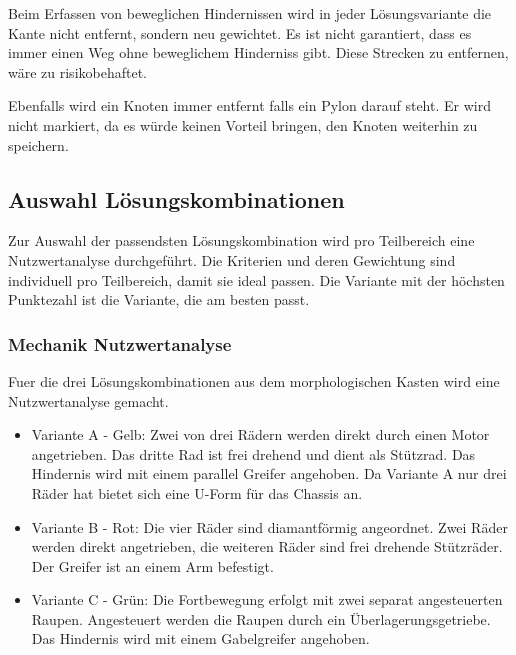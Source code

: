 Beim Erfassen von beweglichen Hindernissen wird in jeder Lösungsvariante die Kante nicht entfernt, sondern neu gewichtet. Es ist nicht garantiert, dass es immer einen Weg ohne beweglichem Hinderniss gibt. Diese Strecken zu entfernen, wäre zu risikobehaftet.

Ebenfalls wird ein Knoten immer entfernt falls ein Pylon darauf steht. Er wird nicht markiert, da es würde keinen Vorteil bringen, den Knoten weiterhin zu speichern.


\newpage
\subsection{Auswahl Lösungskombinationen}\label{nutzwertanalyse}

Zur Auswahl der passendsten Lösungskombination wird pro Teilbereich eine Nutzwertanalyse durchgeführt. Die Kriterien und deren Gewichtung sind individuell pro Teilbereich, damit sie ideal passen. Die Variante mit der höchsten Punktezahl ist die Variante, die am besten passt.

\subsubsection{Mechanik Nutzwertanalyse}

Fuer die  drei Lösungskombinationen aus dem morphologischen Kasten wird eine Nutzwertanalyse gemacht. 

\begin{itemize}
    \item Variante A - Gelb: Zwei von drei Rädern werden direkt durch einen Motor angetrieben. Das dritte Rad ist frei drehend und dient als Stützrad. Das Hindernis wird mit einem parallel Greifer angehoben. Da Variante A nur drei Räder hat bietet sich eine U-Form für das Chassis an. 
    \item Variante B - Rot: Die vier Räder sind diamantförmig angeordnet. Zwei Räder werden direkt angetrieben, die weiteren Räder sind frei drehende Stützräder. Der Greifer ist an einem Arm befestigt. 
    \item Variante C - Grün: Die Fortbewegung erfolgt mit zwei separat angesteuerten Raupen. Angesteuert werden die Raupen durch ein Überlagerungsgetriebe. Das Hindernis wird mit einem Gabelgreifer angehoben. 
\end{itemize}

